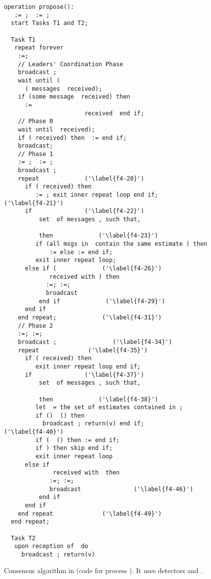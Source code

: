 \documentclass[10pt, conference, compsocconf]{IEEEtran}
\begin{document}
\begin{figure}
\begin{lstlisting}
operation propose():
   := ;  := ;
  start Tasks T1 and T2;
  
  Task T1
   repeat forever
    :=; 
    // Leaders' Coordination Phase
    broadcast ;
    wait until ( 
      ( messages  received);
    if (some message  received) then 
      := 
                       received  end if;
    // Phase 0
    wait until  received);
    if ( received) then  := end if; 
    broadcast;
    // Phase 1
    := ;  := ; 
    broadcast ;
    repeat             ('\label{f4-20}')
      if ( received) then 
         := ; exit inner repeat loop end if;              ('\label{f4-21}')
      if               ('\label{f4-22}')
          set  of messages , such that, 
         
          then             ('\label{f4-23}')
         if (all msgs in  contain the same estimate ) then 
             := else := end if;
         exit inner repeat loop;
      else if (             ('\label{f4-26}')
             received with ) then
            :=; :=; 
            broadcast 
          end if             ('\label{f4-29}')
      end if
    end repeat;             ('\label{f4-31}')
    // Phase 2 
    :=; :=;  
    broadcast ;                ('\label{f4-34}')
    repeat              ('\label{f4-35}')
      if ( received) then 
         exit inner repeat loop end if;
      if               ('\label{f4-37}')
          set  of messages , such that, 
         
          then             ('\label{f4-38}')
         let  = the set of estimates contained in ;
         if ()  () then 
           broadcast ; return(v) end if;             ('\label{f4-40}')
         if (  () then := end if;
         if ) then skip end if;
         exit inner repeat loop
      else if 
              received with  then
             :=; :=; 
             broadcast               ('\label{f4-46}')
          end if
      end if
    end repeat              ('\label{f4-49}')
  end repeat;
     
  Task T2
   upon reception of  do 
     broadcast ; return(v)
\end{lstlisting}
\caption{Consensus algorithm in  (code for process ). It uses detectors  and .}
\label{Fig-Cons-HO-Sigma}
\end{figure}    
\end{document}
